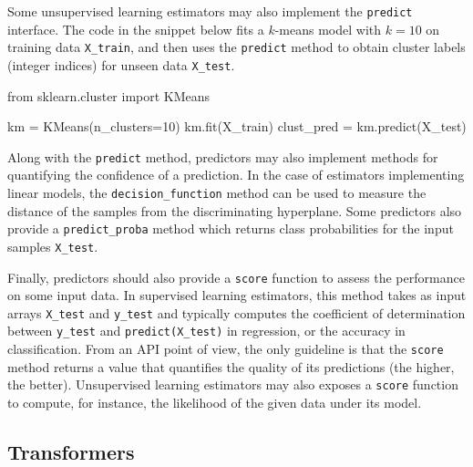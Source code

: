 \documentclass{llncs}
\begin{document}
Some unsupervised learning estimators may also implement the \texttt{predict}
interface. The code in the snippet below fits a $k$-means model with $k=10$ on
training data \texttt{X\_train}, and then uses the  \texttt{predict} method to
obtain cluster labels (integer indices) for unseen data \texttt{X\_test}.
\begin{pythoncode}
from sklearn.cluster import KMeans

km = KMeans(n_clusters=10)
km.fit(X_train)
clust_pred = km.predict(X_test)
\end{pythoncode}

Along with the \texttt{predict} method, predictors may also implement methods
for quantifying the confidence of a prediction. In the case of estimators
implementing linear models, the \texttt{decision\_function} method can be used
to measure the distance of the samples from the discriminating hyperplane. Some
predictors also provide a \texttt{predict\_proba} method which returns
class probabilities for the input samples \texttt{X\_test}.

Finally, predictors should also provide a \texttt{score} function to assess the
performance on some input data. In supervised learning estimators, this method
takes as input arrays \texttt{X\_test} and \texttt{y\_test} and typically
computes the coefficient of determination between \texttt{y\_test} and
\texttt{predict(X\_test)} in regression, or the accuracy
in classification. From an API point of view,
the only guideline is that the \texttt{score} method returns a value
that quantifies the quality of its predictions (the higher, the better).
Unsupervised learning estimators may also exposes a \texttt{score} function
to compute, for instance, the likelihood of the given data under its model.

\subsection{Transformers}
\end{document}
